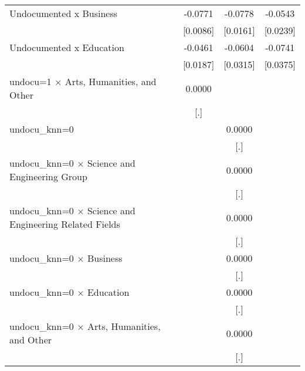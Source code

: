 \begin{table}[htbp]
\begin{tabular}{l*{3}{c}}
\addlinespace
Undocumented x Business&     -0.0771\sym{***}&     -0.0778\sym{***}&     -0.0543\sym{**} \\
                    &    [0.0086]         &    [0.0161]         &    [0.0239]         \\
\addlinespace
Undocumented x Education&     -0.0461\sym{**} &     -0.0604\sym{*}  &     -0.0741\sym{*}  \\
                    &    [0.0187]         &    [0.0315]         &    [0.0375]         \\
\addlinespace
undocu=1 $\times$ Arts, Humanities, and Other&      0.0000         &                     &                     \\
                    &         [.]         &                     &                     \\
\addlinespace
undocu\_knn=0        &                     &      0.0000         &                     \\
                    &                     &         [.]         &                     \\
\addlinespace
undocu\_knn=0 $\times$ Science and Engineering Group&                     &      0.0000         &                     \\
                    &                     &         [.]         &                     \\
\addlinespace
undocu\_knn=0 $\times$ Science and Engineering Related Fields&                     &      0.0000         &                     \\
                    &                     &         [.]         &                     \\
\addlinespace
undocu\_knn=0 $\times$ Business&                     &      0.0000         &                     \\
                    &                     &         [.]         &                     \\
\addlinespace
undocu\_knn=0 $\times$ Education&                     &      0.0000         &                     \\
                    &                     &         [.]         &                     \\
\addlinespace
undocu\_knn=0 $\times$ Arts, Humanities, and Other&                     &      0.0000         &                     \\
                    &                     &         [.]         &                     \\

\end{tabular}
\end{table}
